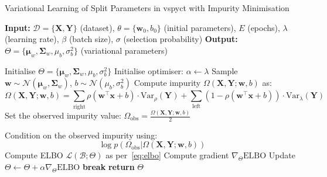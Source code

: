 \documentclass[3p,review,authoryear]{elsarticle}
\begin{document}
\begin{algorithm}[h!]
\caption{Variational Learning of Split Parameters in \gls{vspyct} with Impurity Minimisation}
\label{alg:learn_split_vb}
\begin{algorithmic}[1]
    \State \textbf{Input:} $\mathcal{D} = \{\mathbf{X}, \mathbf{Y}\}$ (dataset), $\theta = \{\mathbf{w}_0, b_0\}$ (initial parameters), $E$ (epochs), $\lambda$ (learning rate), $\beta$ (batch size), $\sigma$ (selection probability)
    \State \textbf{Output:} $\Theta = \{\boldsymbol{\mu}_w, \boldsymbol{\Sigma}_w, \mu_b, \sigma_b^2\}$ (variational parameters)
 
        \State Initialise $\Theta = \{\boldsymbol{\mu}_w, \boldsymbol{\Sigma}_w, \mu_b, \sigma_b^2\}$ 
        \State Initialise optimiser: $\alpha \gets \lambda$
         
                \State Sample $\mathbf{w} \sim \mathcal{N}(\boldsymbol{\mu}_w, \boldsymbol{\Sigma}_w)$, $b \sim \mathcal{N}(\mu_b, \sigma_b^2)$
                \State Compute impurity $\Omega(\mathbf{X}, \mathbf{Y}; \mathbf{w}, b)$ as:
                \[
                \Omega(\mathbf{X}, \mathbf{Y}; \mathbf{w}, b) = \sum_{\text{right}} \rho(\mathbf{w}^\top \mathbf{x} + b) \cdot \text{Var}_\rho(\mathbf{Y}) + \sum_{\text{left}} (1 - \rho(\mathbf{w}^\top \mathbf{x} + b)) \cdot \text{Var}_\lambda(\mathbf{Y})
                \]
                \State Set the observed impurity value: $\Omega_\text{obs} = \frac{\Omega(\mathbf{X}, \mathbf{Y}; \mathbf{w}, b)}{2}$ 

                \State Condition on the observed impurity using:
                \[
                \log p(\Omega_\text{obs}|\Omega(\mathbf{X}, \mathbf{Y}; \mathbf{w}, b))
                \]
                \State Compute ELBO $\mathcal{L}(\mathcal{B}; \Theta)$ as per~\eqref{eq:elbo}
                \State Compute gradient $\nabla_{\Theta} \text{ELBO}$
                \State Update $\Theta \gets \Theta + \alpha \nabla_{\Theta} \text{ELBO}$ 
            \EndFor
                \State \textbf{break}
            \EndIf
        \EndFor
        \State \textbf{return} $\Theta$
    \EndProcedure
\end{algorithmic}
\end{algorithm}
\end{document}
